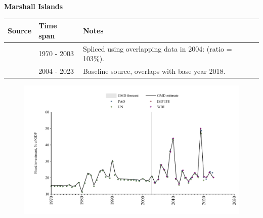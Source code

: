 \documentclass[12pt,a4paper,landscape]{article}
\begin{document}
\begin{adjustbox}{max totalsize={\paperwidth}{\paperheight},center}
\begin{minipage}[t][\textheight][t]{\textwidth}
\vspace*{0.5cm}
{}
\begin{center}
{\Large\bfseries Marshall Islands}
\end{center}
\vspace{0.5cm}
\begin{table}[H]
\centering
\small
\begin{tabular}{|l|l|l|}
\hline
\textbf{Source} & \textbf{Time span} & \textbf{Notes} \\
\hline
\rowcolor{white}\cite{UN}& 1970 - 2003 &Spliced using overlapping data in 2004: (ratio = 103\%).\\
\rowcolor{lightgray}\cite{WDI}& 2004 - 2023 &Baseline source, overlaps with base year 2018.\\
\hline
\end{tabular}
\end{table}
\begin{figure}[H]
\centering
\includegraphics[width=\textwidth,height=0.6\textheight,keepaspectratio]{graphs/MHL_finv_GDP.pdf}
\end{figure}
\end{minipage}
\end{adjustbox}
\end{document}
